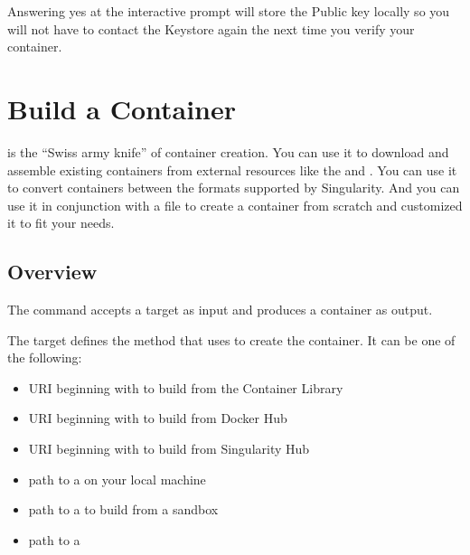 \documentclass[letterpaper,10pt,english]{sphinxmanual}
\begin{document}
Answering yes at the interactive prompt will store the Public key locally so
you will not have to contact the Keystore again the next time you verify your
container.


\chapter{Build a Container}
\label{\detokenize{build_a_container:build-a-container}}\label{\detokenize{build_a_container:id1}}\label{\detokenize{build_a_container::doc}}\label{\detokenize{build_a_container:sec-build-a-container}}
 is the “Swiss army knife” of container creation. You can use it to
download and assemble existing containers from external resources like the
 and
. You can use it to convert containers
between the formats supported by Singularity. And you can use it in conjunction
with a  file to create a
container from scratch and customized it to fit your needs.


\section{Overview}
\label{\detokenize{build_a_container:overview}}
The  command accepts a target as input and produces a container as
output.

The target defines the method that  uses to create the container. It
can be one of the following:
\begin{itemize}
\item {} 
URI beginning with  to build from the Container Library

\item {} 
URI beginning with  to build from Docker Hub

\item {} 
URI beginning with  to build from Singularity Hub

\item {} 
path to a  on your local machine

\item {} 
path to a  to build from a sandbox

\item {} 
path to a 

\end{itemize}
\end{document}
